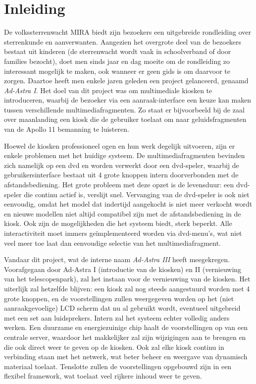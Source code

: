 \chapter{Inleiding}
\label{inleiding}

De volkssterrenwacht MIRA biedt zijn bezoekers een uitgebreide rondleiding over sterrenkunde en aanverwanten. Aangezien het overgrote deel van de bezoekers bestaat uit kinderen (de sterrenwacht wordt vaak in schoolverband of door families bezocht), doet men sinds jaar en dag moeite om de rondleiding zo interessant mogelijk te maken, ook wanneer er geen gids is om daarvoor te zorgen. Daartoe heeft men enkele jaren geleden een project gelanceerd, genaamd \emph{Ad-Astra I}. Het doel van dit project was om multimediale kiosken te introduceren, waarbij de bezoeker via een aanraak-interface een keuze kan maken tussen verschillende multimediafragmenten. Zo staat er bijvoorbeeld bij de zaal over maanlanding een kiosk die de gebruiker toelaat om naar geluidsfragmenten van de Apollo 11 bemanning te luisteren.

Hoewel de kiosken professioneel ogen en hun werk degelijk uitvoeren, zijn er enkele problemen met het huidige systeem. De multimediafragmenten bevinden zich namelijk op een \ac{dvd} en worden verwerkt door een \acs{dvd}-speler, waarbij de gebruikersinterface bestaat uit 4 grote knoppen intern doorverbonden met de afstandsbediening.
Het grote probleem met deze opzet is de levensduur: een \acs{dvd}-speler die continu actief is, verslijt snel. Vervanging van de \acs{dvd}-speler is ook niet eenvoudig, omdat het model dat indertijd aangekocht is niet meer verkocht wordt en nieuwe modellen niet altijd compatibel zijn met de afstandsbediening in de kiosk.
Ook zijn de mogelijkheden die het systeem biedt, sterk beperkt. Alle interactiviteit moet immers geïmplementeerd worden via \acs{dvd}-menu's, wat niet veel meer toe laat dan eenvoudige selectie van het multimediafragment.

Vandaar dit project, wat de interne naam \emph{Ad-Astra III} heeft meegekregen. Voorafgegaan door Ad-Astra I (introductie van de kiosken) en II (vernieuwing van het telescopenpark), zal het instaan voor de vernieuwing van de kiosken. Het uiterlijk zal hetzelfde blijven: een kiosk zal nog steeds aangestuurd worden met 4 grote knoppen, en de voorstellingen zullen weergegeven worden op het (niet aanraakgevoelige) LCD scherm dat nu al gebruikt wordt, eventueel uitgebreid met een set aan luidsprekers.
Intern zal het systeem echter volledig anders werken. Een duurzame en energiezuinige chip haalt de voorstellingen op van een centrale server, waardoor het makkelijker zal zijn wijzigingen aan te brengen en die ook direct weer te geven op de kiosken. Ook zal elke kiosk continu in verbinding staan met het netwerk, wat beter beheer en weergave van dynamisch materiaal toelaat. Tenslotte zullen de voorstellingen opgebouwd zijn in een flexibel framework, wat toelaat veel rijkere inhoud weer te geven.

